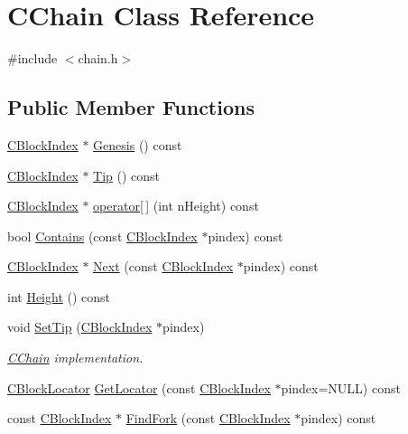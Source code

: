 \hypertarget{class_c_chain}{}\section{C\+Chain Class Reference}
\label{class_c_chain}


{\ttfamily \#include $<$chain.\+h$>$}

\subsection*{Public Member Functions}
\begin{DoxyCompactItemize}
\item 
\hyperlink{class_c_block_index}{C\+Block\+Index} $\ast$ \hyperlink{class_c_chain_a1eee0372da596a8fc68369e480adc2f1}{Genesis} () const 
\item 
\hyperlink{class_c_block_index}{C\+Block\+Index} $\ast$ \hyperlink{class_c_chain_a7482d06d8e8143f46326cf9c12c06daf}{Tip} () const 
\item 
\hyperlink{class_c_block_index}{C\+Block\+Index} $\ast$ \hyperlink{class_c_chain_affb24f7752a2b7e7df25db12b2a40e94}{operator\mbox{[}$\,$\mbox{]}} (int n\+Height) const 
\item 
bool \hyperlink{class_c_chain_a1ab1fe2932227af222699c64847e838b}{Contains} (const \hyperlink{class_c_block_index}{C\+Block\+Index} $\ast$pindex) const 
\item 
\hyperlink{class_c_block_index}{C\+Block\+Index} $\ast$ \hyperlink{class_c_chain_acd3c27582e3d60b93363fda5d9f3775a}{Next} (const \hyperlink{class_c_block_index}{C\+Block\+Index} $\ast$pindex) const 
\item 
int \hyperlink{class_c_chain_a0c4ffb8501acfb8a7e1c0f5e6322ada3}{Height} () const 
\item 
void \hyperlink{class_c_chain_aeb563751f7362d4308c7c2cb35b834a5}{Set\+Tip} (\hyperlink{class_c_block_index}{C\+Block\+Index} $\ast$pindex)
\begin{DoxyCompactList}\small\item\em \hyperlink{class_c_chain}{C\+Chain} implementation. \end{DoxyCompactList}\item 
\hyperlink{class_c_block_locator}{C\+Block\+Locator} \hyperlink{class_c_chain_a3f7e9ed312ad1cadd266a9529586ade6}{Get\+Locator} (const \hyperlink{class_c_block_index}{C\+Block\+Index} $\ast$pindex=N\+U\+L\+L) const 
\item 
const \hyperlink{class_c_block_index}{C\+Block\+Index} $\ast$ \hyperlink{class_c_chain_a14bcab78e65bb934ab148402f3190c86}{Find\+Fork} (const \hyperlink{class_c_block_index}{C\+Block\+Index} $\ast$pindex) const 
\end{DoxyCompactItemize}
